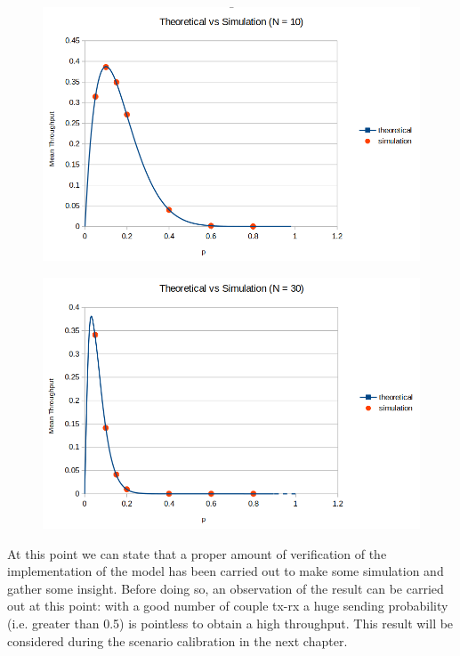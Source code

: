 \begin{figure}[H]
	\centering
	\includegraphics[width=\textwidth]{img/SecondVerificationN10.png}
\end{figure}
\begin{figure}[H]
	\centering
	\includegraphics[width=\textwidth]{img/SecondVerificationN30.png}
\end{figure}

\noindent At this point we can state that a proper amount of verification of the implementation of the model has been carried out to make some simulation and gather some insight. Before doing so, an observation of the result can be carried out at this point: with a good number of couple tx-rx a huge sending probability (i.e. greater than 0.5) is pointless to obtain a high throughput. This result will be considered during the scenario calibration in the next chapter. 